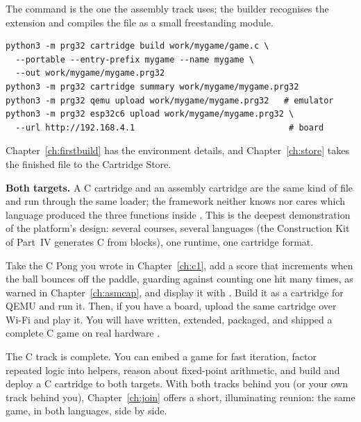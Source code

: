The command is the one the assembly track uses; the builder recognises the
 extension and compiles the file as a small freestanding module.

\begin{lstlisting}[style=bash,caption={Building, inspecting, and running a C cartridge.}]
python3 -m prg32 cartridge build work/mygame/game.c \
  --portable --entry-prefix mygame --name mygame \
  --out work/mygame/mygame.prg32
python3 -m prg32 cartridge summary work/mygame/mygame.prg32
python3 -m prg32 qemu upload work/mygame/mygame.prg32   # emulator
python3 -m prg32 esp32c6 upload work/mygame/mygame.prg32 \
  --url http://192.168.4.1                               # board
\end{lstlisting}

Chapter~\ref{ch:firstbuild} has the environment details, and
Chapter~\ref{ch:store} takes the finished file to the Cartridge Store.

\begin{prgtargets}
\textbf{Both targets.} A C cartridge and an assembly cartridge are the same kind of
file and run through the same loader; the framework neither knows nor cares which
language produced the three functions inside \citep{prg32teaching}. This is the
deepest demonstration of the platform's design: several courses, several
languages (the Construction Kit of Part~IV generates C from blocks), one
runtime, one cartridge format.
\end{prgtargets}

\begin{prgtry}
Take the C Pong you wrote in Chapter~\ref{ch:c1}, add a score that increments when
the ball bounces off the paddle, guarding against counting one hit many times, as
warned in Chapter~\ref{ch:asmcap}, and display it with .
Build it as a cartridge for QEMU and run it. Then, if you have a board, upload the
same cartridge over Wi-Fi and play it. You will have written, extended, packaged,
and shipped a complete C game on real \riscv hardware \citep{prg32repo}.
\end{prgtry}

\begin{prgcheck}
The C track is complete. You can embed a game for fast iteration, factor repeated
logic into helpers, reason about fixed-point arithmetic, and build and deploy a C
cartridge to both targets. With both tracks behind you (or your own track behind
you), Chapter~\ref{ch:join} offers a short, illuminating reunion: the same game,
in both languages, side by side.
\end{prgcheck}
